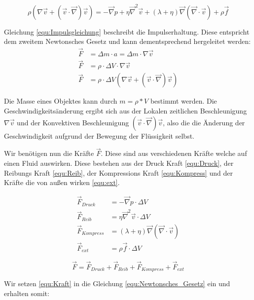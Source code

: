 \documentclass[a4paper, 12pt]{article}
\begin{document}
\begin{equation}
    \rho(\nabla \vec{v} + (\vec{v} \cdot \vec{\nabla})\vec{v}) = - \vec{\nabla}p + \eta \vec{\nabla}^2 \vec{v} + (\lambda + \eta)\vec{\nabla}(\vec{\nabla} \cdot \vec{v}) + \rho \vec{f}
    \label{equ:Impulsgleichung}
\end{equation} 

Gleichung \eqref{equ:Impulsgleichung} beschreibt die Impulserhaltung. Diese entspricht dem zweitem Newtonsches Gesetz und kann dementsprechend hergeleitet werden:
\begin{align}
    \vec{F}&=\Delta m \cdot a = \Delta m \cdot \nabla \vec{v} \nonumber\\
    \vec{F}&=\rho \cdot \Delta V \cdot \nabla \vec{v} \nonumber\\
    \vec{F}&=\rho \cdot \Delta V (\nabla \vec{v} + (\vec{v} \cdot \vec{\nabla})\vec{v})
    \label{equ:Newtonsches_Gesetz}
\end{align}

Die Masse eines Objektes kann durch $m = \rho * V$ bestimmt werden. Die Geschwindigkeitsänderung ergibt sich aus der Lokalen zeitlichen Beschleunigung $\nabla \vec{v}$ und der Konvektiven Beschleunigung $(\vec{v} \cdot \vec{\nabla})\vec{v}$, also die die Änderung der Geschwindigkeit aufgrund der Bewegung der Flüssigkeit selbst.

Wir benötigen nun die Kräfte $\vec{F}$. Diese sind aus verschiedenen Kräfte welche auf einen Fluid auswirken. Diese bestehen aus der Druck Kraft \eqref{equ:Druck}, der Reibungs Kraft \eqref{equ:Reib}, der Kompressions Kraft \eqref{equ:Kompress} und der Kräfte die von außen wirken \eqref{equ:ext}.

\begin{align}
    \vec{F}_{Druck} &= - \vec{\nabla}p \cdot \Delta V \label{equ:Druck}\\
    \vec{F}_{Reib} &= \eta \vec{\nabla}^2 \vec{v} \cdot \Delta V \label{equ:Reib}\\
    \vec{F}_{Kompress} &= (\lambda + \eta)\vec{\nabla}(\vec{\nabla} \cdot \vec{v}) \label{equ:Kompress}\\
    \vec{F}_{ext} &= \rho \vec{f} \cdot \Delta V \label{equ:ext}
\end{align}

\begin{equation} \label{equ:Kraft}
    \vec{F} = \vec{F}_{Druck} + \vec{F}_{Reib} + \vec{F}_{Kompress} + \vec{F}_{ext}
\end{equation}

Wir setzen \eqref{equ:Kraft} in die Gleichung \eqref{equ:Newtonsches_Gesetz} ein und erhalten somit:
\end{document}
